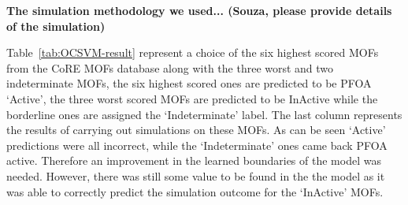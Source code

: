 \documentclass[twoside,twocolumn,9pt]{article}
\begin{document}
\textcolor{myred}{\textbf{The simulation methodology we used... (Souza, please provide details of the simulation)}}

Table~\ref{tab:OCSVM-result} represent a choice of the six highest scored MOFs from the CoRE MOFs database along with the three worst and two indeterminate MOFs, the six highest scored ones are predicted to be PFOA `Active', the three worst scored MOFs are predicted to be InActive while the borderline ones are assigned the `Indeterminate' label. The last column represents the results of carrying out simulations on these MOFs. As can be seen `Active' predictions were all incorrect, while the `Indeterminate' ones came back PFOA active. Therefore an improvement in the learned boundaries of the model was needed. However, there was still some value to be found in the the model as it was able to correctly predict the simulation outcome for the `InActive' MOFs.
\end{document}
